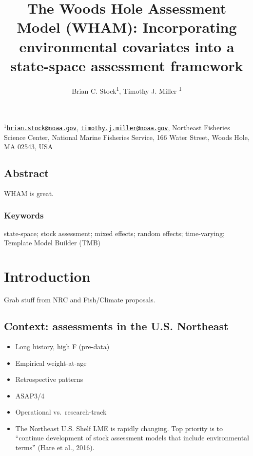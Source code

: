 \documentclass[]{article}
\title{The Woods Hole Assessment Model (WHAM): Incorporating environmental
covariates into a state-space assessment framework}
\author{Brian C. Stock\textsuperscript{1}, Timothy J. Miller \textsuperscript{1}}
\date{}
\providecommand{\tightlist}{%
  \setlength{\itemsep}{0pt}\setlength{\parskip}{0pt}}
\begin{document}
\maketitle

\(^1\)\href{mailto:brian.stock@noaa.gov}{\nolinkurl{brian.stock@noaa.gov}},
\href{mailto:timothy.j.miller@noaa.gov}{\nolinkurl{timothy.j.miller@noaa.gov}},
Northeast Fisheries Science Center, National Marine Fisheries Service,
166 Water Street, Woods Hole, MA 02543, USA\\

\pagebreak

\hypertarget{abstract}{%
\subsection*{Abstract}\label{abstract}}

WHAM is great.

\hypertarget{keywords}{%
\subsubsection*{Keywords}\label{keywords}}

state-space; stock assessment; mixed effects; random effects;
time-varying; Template Model Builder (TMB)

\pagebreak

\hypertarget{introduction}{%
\section{Introduction}\label{introduction}}

Grab stuff from NRC and Fish/Climate proposals.

\hypertarget{context-assessments-in-the-u.s.-northeast}{%
\subsection{Context: assessments in the U.S.
Northeast}\label{context-assessments-in-the-u.s.-northeast}}

\begin{itemize}
\tightlist
\item
  Long history, high F (pre-data)
\item
  Empirical weight-at-age
\item
  Retrospective patterns
\item
  ASAP3/4
\item
  Operational vs.~research-track
\item
  The Northeast U.S. Shelf LME is rapidly changing. Top priority is to
  ``continue development of stock assessment models that include
  environmental terms'' (Hare et al., 2016).
\end{itemize}
\end{document}
